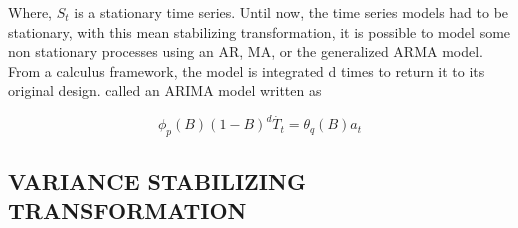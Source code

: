 Where, $S_t$ is a stationary time series. Until now, the time series models had to be stationary, with this mean stabilizing transformation, it is possible to model some non stationary processes using an AR, MA, or the generalized ARMA model. From a calculus framework, the model is integrated d times to return it to its original design.  called an ARIMA model written as

\begin{equation}\label{eq:arima}
\phi_p(B)(1-B)^d  \dot{T_{t}} = \theta_q(B)a_t
\end{equation}

\subsection{VARIANCE STABILIZING TRANSFORMATION}

